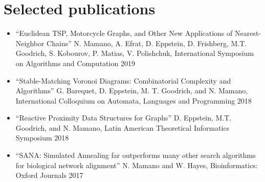 \documentclass[letterpaper,10pt,oneside]{article}
\begin{document}
\section*{Selected publications}
\begin{itemize}[leftmargin=15px]
\item ``Euclidean TSP, Motorcycle Graphs, and Other New Applications of Nearest-Neighbor Chains'' N. Mamano, A. Efrat, D. Eppstein, D. Frishberg, M.T. Goodrich, S. Kobourov, P. Matias, V. Polishchuk, International Symposium on Algorithms and Computation 2019
\item ``Stable-Matching Voronoi Diagrams: Combinatorial Complexity and Algorithms'' G. Barequet, D. Eppstein, M. T. Goodrich, and N. Mamano, International Colloquium on Automata, Languages and Programming 2018
\item ``Reactive Proximity Data Structures for Graphs'' D. Eppstein, M.T. Goodrich, and N. Mamano, Latin American Theoretical Informatics Symposium 2018
\item ``SANA: Simulated Annealing far outperforms many other search algorithms for biological network alignment'' N. Mamano and W. Hayes, Bioinformatics: Oxford Journals 2017
\end{itemize}
\end{document}
